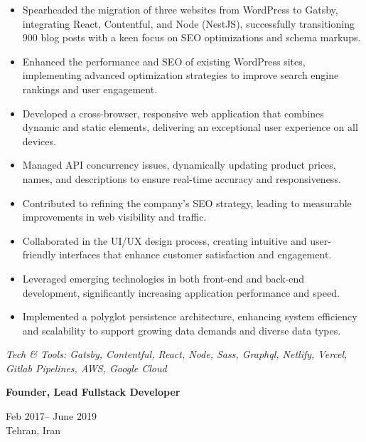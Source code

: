 \documentclass[10pt,a4paper,ragged2e,withhyper]{altacv}
\renewcommand{\cvevent}[4]{%
  \textbf{#1} %
  \hfill %
  \begin{minipage}[t]{.5\linewidth}
    \raggedleft %
    \small#3 %
    \\ %
    #4 %
  \end{minipage}
  \vspace{\baselineskip} %
}
\begin{document}
\begin{itemize}
  \item Spearheaded the migration of three websites from WordPress to Gatsby, integrating React, Contentful, and Node (NestJS), successfully transitioning 900 blog posts with a keen focus on SEO optimizations and schema markups.
  \item Enhanced the performance and SEO of existing WordPress sites, implementing advanced optimization strategies to improve search engine rankings and user engagement.
  \item Developed a cross-browser, responsive web application that combines dynamic and static elements, delivering an exceptional user experience on all devices.
  \item Managed API concurrency issues, dynamically updating product prices, names, and descriptions to ensure real-time accuracy and responsiveness.
  \item Contributed to refining the company’s SEO strategy, leading to measurable improvements in web visibility and traffic.
  \item Collaborated in the UI/UX design process, creating intuitive and user-friendly interfaces that enhance customer satisfaction and engagement.
  \item Leveraged emerging technologies in both front-end and back-end development, significantly increasing application performance and speed.
  \item Implemented a polyglot persistence architecture, enhancing system efficiency and scalability to support growing data demands and diverse data types.
\end{itemize}


\vspace{0.5cm}

\textit{Tech \& Tools: Gatsby, Contentful, React, Node, Sass, Graphql, Netlify, Vercel, Gitlab Pipelines, AWS, Google Cloud}

 

\divider

\cvevent{Founder, Lead Fullstack Developer}{Pouyaraveshan Academy}{Feb 2017-- June 2019}{Tehran, Iran}
\end{document}
